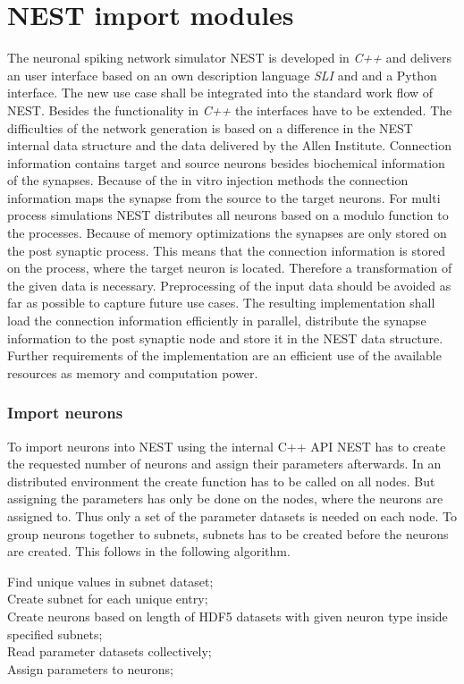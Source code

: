 \section{NEST import modules}

The neuronal spiking network simulator NEST is developed in \emph{C++} and delivers
an user interface based on an own description language \emph{SLI} and  and a Python interface.
The new use case shall be integrated into the standard work flow of NEST.
Besides the functionality in \emph{C++} the interfaces have to be extended.
The difficulties of the network generation is based on a difference in 
the NEST internal data structure and the data delivered by the Allen Institute.
Connection information contains target and source neurons besides biochemical
information of the synapses. Because of the in vitro injection methods the
connection information maps the synapse from the source to the target neurons.
For multi process simulations NEST distributes all neurons based on a modulo function 
to the processes. Because of memory optimizations the synapses are only stored on the
post synaptic process. This means that the connection information is stored
on the process, where the target neuron is located. Therefore a transformation of the given data is
necessary. Preprocessing of the input data should be avoided as far as possible to capture
future use cases.
The resulting implementation shall load the connection information efficiently in parallel,
distribute the synapse information to the post synaptic node and store it in
the NEST data structure.
Further requirements of the implementation are an efficient use of the available resources as
memory and computation power. 


\subsubsection{Import neurons}
To import neurons into NEST using the internal C++ API NEST has to create the requested number of neurons and
assign their parameters afterwards. In an distributed environment the create function has to be called on all nodes. But assigning the parameters has only be done on the nodes, where the neurons are assigned to.
Thus only a set of the parameter datasets is needed on each node.
To group neurons together to subnets, subnets has to be created before the neurons are created.
This follows in the following algorithm.

\begin{algorithm}
 Find unique values in subnet dataset; \\
 Create subnet for each unique entry; \\
 Create neurons based on length of HDF5 datasets with given neuron type inside specified subnets; \\
 Read parameter datasets collectively; \\
 Assign parameters to neurons;
\label{alg2}
\caption{}
\end{algorithm}

